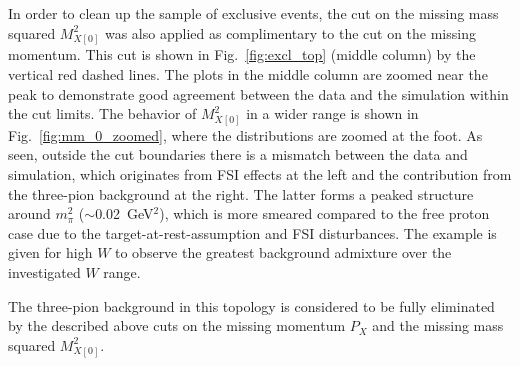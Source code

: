 In order to clean up the sample of exclusive events, the cut on the missing mass squared $M^{2}_{X[0]}$ was also applied as complimentary to the cut on the missing momentum. This cut is shown in Fig.~\ref{fig:excl_top} (middle column) by the vertical red dashed lines. The plots in the middle column are zoomed near the peak to demonstrate good agreement between the data and the simulation within the cut limits. The behavior of $M^{2}_{X[0]}$ in a wider range is shown in Fig.~\ref{fig:mm_0_zoomed}, where the distributions are zoomed at the foot. As seen, outside the cut boundaries there is a mismatch between the data and simulation, which originates from FSI effects at the left and the contribution from the three-pion background at the right. The latter forms a peaked structure around $m_{\pi}^{2}$ ($\sim$0.02~GeV$^{2}$), which is more smeared compared to the free proton case due to the target-at-rest-assumption and FSI disturbances. The example is given for high $W$ to observe the greatest background admixture over the investigated $W$ range.

The three-pion background in this topology is considered to be fully eliminated by the described above cuts on the missing momentum $P_{X}$ and the missing mass squared $M^{2}_{X[0]}$.


